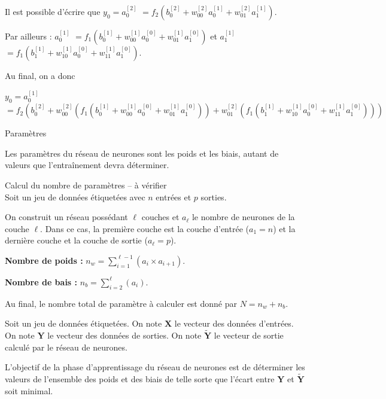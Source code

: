 \begin{exemple}
Il est possible d'écrire que 
$y_0 = a_0^{[2]}$ 
$ = f_2\left(b_0^{[2]}+ w_{00}^{[2]} a_0^{[1]}+ w_{01}^{[2]} a_1^{[1]}\right)$.

Par ailleurs : 
 $  a_0^{[1]}$ 
$ = f_1\left(b_0^{[1]}+ w_{00}^{[1]} a_0^{[0]}+ w_{01}^{[1]} a_1^{[0]}\right)$ et
  $  a_1^{[1]}$ 
$ = f_1\left(b_1^{[1]}+ w_{10}^{[1]} a_0^{[0]}+ w_{11}^{[1]} a_1^{[0]}\right)$.

Au final, on a donc 

$y_0 = a_0^{[1]}$
$ =  f_2\left(b_0^{[2]}+ w_{00}^{[2]}\left(f_1\left(b_0^{[1]}+ w_{00}^{[1]} a_0^{[0]}+ w_{01}^{[1]} a_1^{[0]}\right)\right)+ w_{01}^{[2]} \left( f_1\left(b_1^{[1]}+ w_{10}^{[1]} a_0^{[0]}+ w_{11}^{[1]} a_1^{[0]}\right)\right)\right) $ 


\end{exemple}

\begin{defi}{Paramètres}

Les paramètres du réseau de neurones sont les poids et les biais, autant de valeurs que l’entraînement devra déterminer.

\end{defi}
\begin{methode}{Calcul du nombre de paramètres -- à vérifier} ~\\

Soit un jeu de données étiquetées avec $n$ entrées et $p$ sorties.

On construit un réseau possédant $\ell$ couches  et $a_\ell$ le nombre de neurones de la couche  $\ell$. Dans ce cas, la première couche est la couche d'entrée ($a_1 = n$) et la dernière couche et la couche de sortie ($a_\ell= p$).


\textbf{Nombre de poids :} $n_w = \sum\limits_{i=1}^{\ell-1} \left(a_i \times a_{i+1}\right)$.

\textbf{Nombre de bais :} $n_b = \sum\limits_{i=2}^{\ell}\left( a_i  \right)$.


Au final, le nombre total de paramètre à calculer est donné par $N=n_w+n_b$.

\end{methode}
\begin{obj}
Soit un jeu de données étiquetées. On note $\mathbf{X}$ le vecteur des données d'entrées. On note $\mathbf{Y}$ le vecteur des données de sorties. On note
$\mathbf{\tilde{Y}}$ le vecteur de sortie calculé par le réseau de neurones.


L'objectif de la phase d'apprentissage du réseau de neurones est de déterminer les valeurs de  l'ensemble des poids et des biais de telle sorte que l'écart entre $\mathbf{Y}$ 
et $\mathbf{\tilde{Y}}$ soit minimal.
\end{obj}




